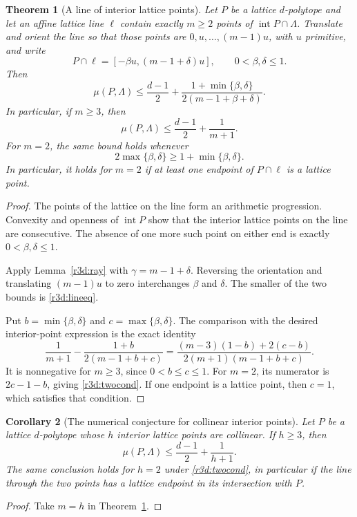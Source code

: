 \documentclass[11pt,a4paper]{article}
\newtheorem{theorem}{Theorem}[section]
\newtheorem{corollary}[theorem]{Corollary}
\theoremstyle{remark}\newtheorem{remark}[theorem]{Remark}
\DeclareMathOperator{\inter}{int}
\begin{document}
\begin{theorem}[A line of interior lattice points]
\label{r3d:line}
Let $P$ be a lattice $d$-polytope and let an affine lattice line
$\ell$ contain exactly $m\ge2$ points of $\inter P\cap\Lambda$.
Translate and orient the line so that those points are
$0,u,\ldots,(m-1)u$, with $u$ primitive, and write
\[
 P\cap\ell=[-\beta u,(m-1+\delta)u],
 \qquad 0<\beta,\delta\le1.
\]
Then
\begin{equation}\label{r3d:lineeq}
 \boxed{\displaystyle
 \mu(P,\Lambda)\le\frac{d-1}{2}
       +\frac{1+\min\{\beta,\delta\}}
                    {2(m-1+\beta+\delta)}.}
\end{equation}
In particular, if $m\ge3$, then
\begin{equation}\label{r3d:mbound}
 \mu(P,\Lambda)\le\frac{d-1}{2}+\frac{1}{m+1}.
\end{equation}
For $m=2$, the same bound holds whenever
\begin{equation}\label{r3d:twocond}
 2\max\{\beta,\delta\}\ge1+\min\{\beta,\delta\}.
\end{equation}
In particular, it holds for $m=2$ if at least one endpoint of
$P\cap\ell$ is a lattice point.
\end{theorem}
\begin{proof}
The points of the lattice on the line form an arithmetic progression.
Convexity and openness of $\inter P$ show that the interior lattice
points on the line are consecutive.  The absence of one more such
point on either end is exactly $0<\beta,\delta\le1$.

Apply Lemma~\ref{r3d:ray} with $\gamma=m-1+\delta$.  Reversing the
orientation and translating $(m-1)u$ to zero interchanges $\beta$ and
$\delta$.  The smaller of the two bounds is \eqref{r3d:lineeq}.

Put $b=\min\{\beta,\delta\}$ and $c=\max\{\beta,\delta\}$.  The
comparison with the desired interior-point expression is the exact
identity
\begin{equation}\label{r3d:comparison}
 \frac{1}{m+1}-\frac{1+b}{2(m-1+b+c)}
 =\frac{(m-3)(1-b)+2(c-b)}
        {2(m+1)(m-1+b+c)}.
\end{equation}
It is nonnegative for $m\ge3$, since $0<b\le c\le1$.  For $m=2$,
its numerator is $2c-1-b$, giving \eqref{r3d:twocond}.  If one endpoint
is a lattice point, then $c=1$, which satisfies that condition.
\end{proof}

\begin{corollary}[The numerical conjecture for collinear interior points]
\label{r3d:collinear}
Let $P$ be a lattice $d$-polytope whose $h$ interior lattice points
are collinear.  If $h\ge3$, then
\[
 \mu(P,\Lambda)\le\frac{d-1}{2}+\frac{1}{h+1}.
\]
The same conclusion holds for $h=2$ under
\eqref{r3d:twocond}, in particular if the line through the two points
has a lattice endpoint in its intersection with $P$.
\end{corollary}
\begin{proof}
Take $m=h$ in Theorem~\ref{r3d:line}.
\end{proof}
\end{document}
